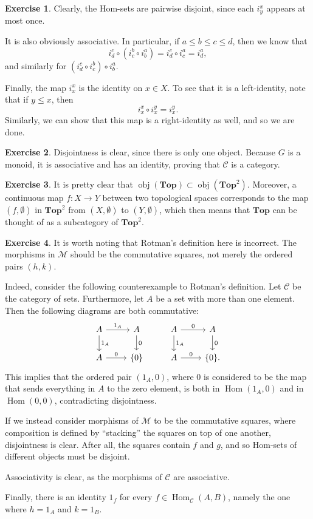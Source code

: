 \documentclass[10pt]{article}
\theoremstyle{definition}
\newtheorem{intex}{Exercise}[section]
\newenvironment{exercise}{\begin{intex}\label{\theintex}}{\end{intex}}
\DeclareMathOperator\obj{obj}
\DeclareMathOperator\Hom{Hom}
\newcommand*\Cat[1]{\textbf{#1}}
\newcommand*\Top{\Cat{Top}}
\begin{document}
\begin{exercise} \leavevmode
Clearly, the Hom-sets are pairwise disjoint, since each $i^x_y$ appears at most once. 

It is also obviously associative. In particular, if $a\le b\le c\le d$, then we know that \[i^c_d\circ\left(i^b_c\circ i^a_b\right)=i^c_d\circ i^a_c=i^a_d,\] and similarly for $\left(i^c_d\circ i^b_c\right)\circ i^a_b$. 

Finally, the map $i^x_x$ is the identity on $x\in X$. To see that it is a left-identity, note that if $y\le x$, then \[i_x^x\circ i_x^y=i_x^y.\] Similarly, we can show that this map is a right-identity as well, and so we are done. 
\end{exercise} 

\begin{exercise} \leavevmode
Disjointness is clear, since there is only one object. Because $G$ is a monoid, it is associative and has an identity, proving that $\mathcal C$ is a category. 
\end{exercise} 

\begin{exercise} \leavevmode
It is pretty clear that $\obj(\Top)\subset\obj(\Top^2)$. Moreover, a continuous map $f:X\to Y$ between two topological spaces corresponds to the map $(f,\emptyset)$ in $\Top^2$ from $(X,\emptyset)$ to $(Y,\emptyset)$, which then means that $\Top$ can be thought of as a subcategory of $\Top^2$. 
\end{exercise} 

\begin{exercise} \leavevmode
It is worth noting that Rotman's definition here is incorrect. The morphisms in $\mathcal M$ should be the commutative squares, not merely the ordered pairs $(h,k)$. 

Indeed, consider the following counterexample to Rotman's definition. Let $\mathcal C$ be the category of sets. Furthermore, let $A$ be a set with more than one element. Then the following diagrams are both commutative: 
\[\begin{tikzcd}
A\arrow[r,"1_A"]\arrow[d,"1_A"]&A\arrow[d,"0"]&A\arrow[r,"0"]\arrow[d,"1_A"]&A\arrow[d,"0"]\\ 
A\arrow[r,"0"]&\{0\}&A\arrow[r,"0"]&\{0\}.
\end{tikzcd}\]
This implies that the ordered pair $(1_A,0)$, where $0$ is considered to be the map that sends everything in $A$ to the zero element, is both in $\Hom(1_A,0)$ and in $\Hom(0,0)$, contradicting disjointness. 

If we instead consider morphisms of $\mathcal M$ to be the commutative squares, where composition is defined by ``stacking'' the squares on top of one another, disjointness is clear. After all, the squares contain $f$ and $g$, and so Hom-sets of different objects must be disjoint. 

Associativity is clear, as the morphisms of $\mathcal C$ are associative.

Finally, there is an identity $1_f$ for every $f\in\Hom_{\mathcal C}(A,B)$, namely the one where $h=1_A$ and $k=1_B$. 
\end{exercise} 
\end{document}

